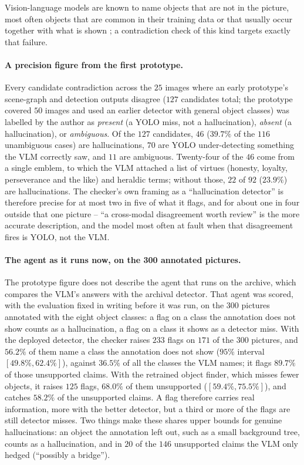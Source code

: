 \documentclass[12pt,a4paper]{report}
\begin{document}
Vision-language models are known to name objects that are not in the picture, most often objects that are common in their training data or that usually occur together with what is shown \cite{li2023pope}; a contradiction check of this kind targets exactly that failure.

\paragraph{A precision figure from the first prototype.} Every candidate contradiction across the $25$ images where an early prototype's scene-graph and detection outputs disagree ($127$ candidates total; the prototype covered $50$ images and used an earlier detector with general object classes) was labelled by the author as \textit{present} (a YOLO miss, not a hallucination), \textit{absent} (a hallucination), or \textit{ambiguous}. Of the $127$ candidates, $46$ ($39.7\%$ of the $116$ unambiguous cases) are hallucinations, $70$ are YOLO under-detecting something the VLM correctly saw, and $11$ are ambiguous. Twenty-four of the $46$ come from a single emblem, to which the VLM attached a list of virtues (honesty, loyalty, perseverance and the like) and heraldic terms; without those, $22$ of $92$ ($23.9\%$) are hallucinations. The checker's own framing as a ``hallucination detector'' is therefore precise for at most two in five of what it flags, and for about one in four outside that one picture -- ``a cross-modal disagreement worth review'' is the more accurate description, and the model most often at fault when that disagreement fires is YOLO, not the VLM.

\paragraph{The agent as it runs now, on the 300 annotated pictures.} The prototype figure does not describe the agent that runs on the archive, which compares the VLM's answers with the archival detector. That agent was scored, with the evaluation fixed in writing before it was run, on the $300$ pictures annotated with the eight object classes: a flag on a class the annotation does not show counts as a hallucination, a flag on a class it shows as a detector miss. With the deployed detector, the checker raises $233$ flags on $171$ of the $300$ pictures, and $56.2\%$ of them name a class the annotation does not show ($95\%$ interval $[49.8\%, 62.4\%]$), against $36.5\%$ of all the classes the VLM names; it flags $89.7\%$ of those unsupported claims. With the retrained object finder, which misses fewer objects, it raises $125$ flags, $68.0\%$ of them unsupported ($[59.4\%, 75.5\%]$), and catches $58.2\%$ of the unsupported claims. A flag therefore carries real information, more with the better detector, but a third or more of the flags are still detector misses. Two things make these shares upper bounds for genuine hallucinations: an object the annotation left out, such as a small background tree, counts as a hallucination, and in $20$ of the $146$ unsupported claims the VLM only hedged (``possibly a bridge'').
\end{document}
